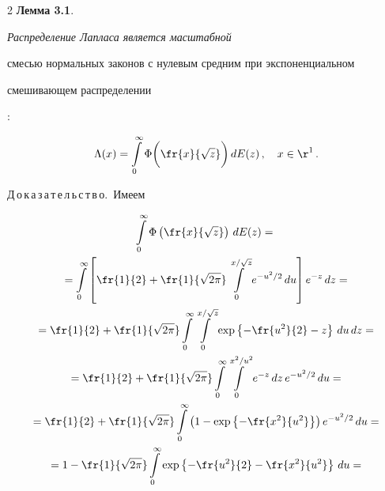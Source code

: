 \begin{multicols}{2}
\textbf{Лемма 3.1}. {\it Распределение Лапласа является масштабной


смесью нормальных законов с нулевым средним при экспоненциальном


смешивающем распределении}:


$$


\Lambda(x)=\int\limits_{0}^{\infty}\Phi\bigg(\fr{x}{\sqrt{z}}\bigg)\,dE(z)\,,\quad


 x\in{\r}^1\,.


$$





\smallskip





\noindent


Д\,о\,к\,а\,з\,а\,т\,е\,л\,ь\,с\,т\,в\,о.~Имеем


\begin{multline*}


\int\limits_{0}^{\infty}\Phi\left(\fr{x}{\sqrt{z}}\right)\,dE(z)={}\\


{}=\int\limits_{0}^


{\infty}\left[ \fr{1}{2}+


\fr{1}{\sqrt{2\pi}}\int\limits_{0}^{x/\sqrt{z}}e^{-u^2/2}\,du\right ]


e^{-z}\,dz={}\\


{}=\fr{1}{2}+\fr{1}{\sqrt{2\pi}}\int\limits_{0}^{\infty}


\int\limits_{0}^{x/\sqrt{z}}\exp\left\{


-\fr{u^2}{2}-z\right \}\,du\,dz={}\\


{}=


\fr{1}{2}+\fr{1}{\sqrt{2\pi}}


\int\limits_{0}^{\infty}\int\limits_{0}^{x^2/u^2}e^{-z}\,dz\,


e^{-u^2/2}\,du={}\\


{}


=\fr{1}{2}+\fr{1}{\sqrt{2\pi}}\int\limits_{0}^{\infty}\left(


1-\exp\left \{-\fr{x^2}{u^2}\right \}\right )e^{-u^2/2}\,du={}\\


{}=


1-\fr{1}{\sqrt{2\pi}}\int\limits_{0}^{\infty}


\exp\left\{-\fr{u^2}{2}-\fr{x^2}{u^2}\right \}\,du={}\\



\end{multline*}
\end{multicols}
